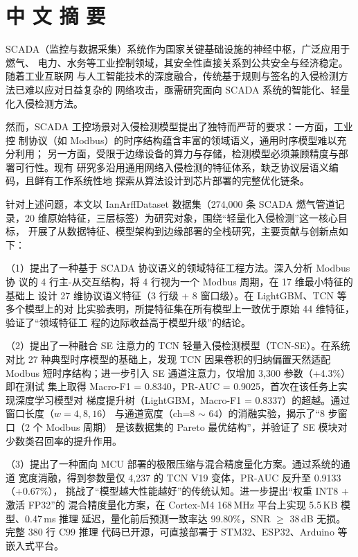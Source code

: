 \chapter*{\hfill 中 文 摘 要 \hfill}
\thispagestyle{fancy}

\setcounter{page}{1}

\par SCADA（监控与数据采集）系统作为国家关键基础设施的神经中枢，广泛应用于燃气、
电力、水务等工业控制领域，其安全性直接关系到公共安全与经济稳定。随着工业互联网
与人工智能技术的深度融合，传统基于规则与签名的入侵检测方法已难以应对日益复杂的
网络攻击，亟需研究面向 SCADA 系统的智能化、轻量化入侵检测方法。

\par 然而，SCADA 工控场景对入侵检测模型提出了独特而严苛的要求：一方面，工业控
制协议（如 Modbus）的时序结构蕴含丰富的领域语义，通用时序模型难以充分利用；
另一方面，受限于边缘设备的算力与存储，检测模型必须兼顾精度与部署可行性。现有
研究多沿用通用网络入侵检测的特征体系，缺乏协议层语义编码，且鲜有工作系统性地
探索从算法设计到芯片部署的完整优化链条。

\par 针对上述问题，本文以 IanArffDataset 数据集（274{,}000 条 SCADA 燃气管道记
录，20 维原始特征，三层标签）为研究对象，围绕``轻量化入侵检测''这一核心目标，
开展了从数据特征、模型架构到边缘部署的全栈研究，主要贡献与创新点如下：

\par （1）提出了一种基于 SCADA 协议语义的领域特征工程方法。深入分析 Modbus 协
议的 4 行主-从交互结构，将 4 行视为一个 Modbus 周期，在 17 维最小特征的基础上
设计 27 维协议语义特征（3 行级 + 8 窗口级）。在 LightGBM、TCN 等多个模型上的对
比实验表明，所提特征集在所有模型上一致优于原始 44 维特征，验证了``领域特征工
程的边际收益高于模型升级''的结论。

\par （2）提出了一种融合 SE 注意力的 TCN 轻量入侵检测模型（TCN-SE）。在系统
对比 27 种典型时序模型的基础上，发现 TCN 因果卷积的归纳偏置天然适配 Modbus
短时序结构；进一步引入 SE 通道注意力，仅增加 3{,}300 参数（+4.3\%）即在测试
集上取得 Macro-F1 = 0.8340，PR-AUC = 0.9025，首次在该任务上实现深度学习模型对
梯度提升树（LightGBM，Macro-F1 = 0.8337）的超越。通过窗口长度（$w=4, 8, 16$）
与通道宽度（ch=8 $\sim$ 64）的消融实验，揭示了``8 步窗口（2 个 Modbus 周期）
是该数据集的 Pareto 最优结构''，并验证了 SE 模块对少数类召回率的提升作用。

\par （3）提出了一种面向 MCU 部署的极限压缩与混合精度量化方案。通过系统的通道
宽度消融，得到参数量仅 4{,}237 的 TCN V19 变体，PR-AUC 反升至 0.9133（+0.67\%），
挑战了``模型越大性能越好''的传统认知。进一步提出``权重 INT8 + 激活 FP32''的
混合精度量化方案，在 Cortex-M4 168\,MHz 平台上实现 5.5\,KB 模型、0.47\,ms 推理
延迟，量化前后预测一致率达 99.80\%，SNR $\geq$ 38\,dB 无损。完整 380 行 C99 推理
代码已开源，可直接部署于 STM32、ESP32、Arduino 等嵌入式平台。

